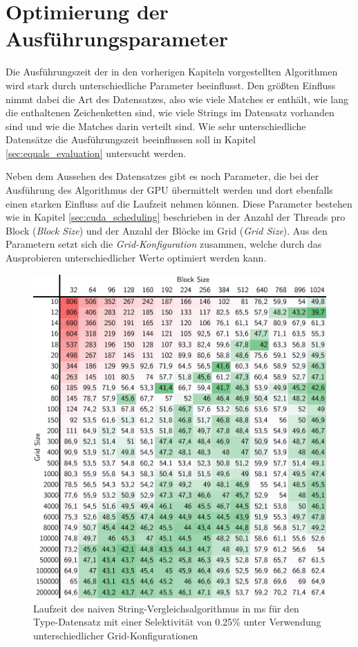\chapter{Optimierung der Ausführungsparameter}

Die Ausführungszeit der in den vorherigen Kapiteln vorgestellten Algorithmen wird stark durch unterschiedliche Parameter beeinflusst.
Den größten Einfluss nimmt dabei die Art des Datensatzes, also wie viele Matches er enthält, wie lang die enthaltenen Zeichenketten sind, wie viele Strings im Datensatz vorhanden sind und wie die Matches darin verteilt sind.
Wie sehr unterschiedliche Datensätze die Ausführungszeit beeinflussen soll in Kapitel \ref{sec:equals_evaluation} untersucht werden.

Neben dem Aussehen des Datensatzes gibt es noch Parameter, die bei der Ausführung des Algorithmus der GPU übermittelt werden und dort ebenfalls einen starken Einfluss auf die Laufzeit nehmen können.
Diese Parameter bestehen wie in Kapitel \ref{sec:cuda_scheduling} beschrieben in der Anzahl der Threads pro Block (\emph{Block Size}) und der Anzahl der Blöcke im Grid (\emph{Grid Size}).
Aus den Parametern setzt sich die \emph{Grid-Konfiguration} zusammen, welche durch das Ausprobieren unterschiedlicher Werte optimiert werden kann.

\begin{figure}[ht]
	\includegraphics[]{bilder/parameter025.pdf}
	\caption{Laufzeit des naiven String-Vergleichsalgorithmus in ms für den Type-Datensatz mit einer Selektivität von 0.25\% unter Verwendung unterschiedlicher Grid-Konfigurationen}
	\label{gpu_architecture}
\end{figure}

